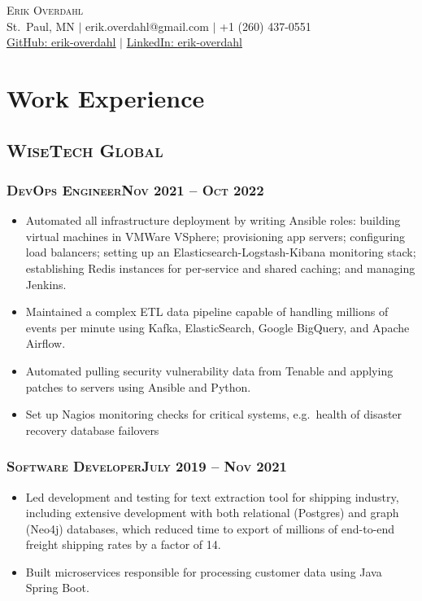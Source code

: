 \documentclass{article}
\newcommand{\resumeSection}[1]{\section*{#1}}
\newcommand{\institution}[1]{\subsection*{\scshape{#1}}}
\newcommand{\jobPosition}[3]{\subsubsection*{\scshape{#1}\hfill #2 -- #3}}
\begin{document}
\begin{center}
  {\Huge\scshape{Erik Overdahl}}
  \\\vspace{3pt}
  \normalsize{
    St.\ Paul, MN
    $|$
    erik.overdahl@gmail.com
    $|$
    +1 (260) 437-0551
    \\
    \href{https://github.com/erik-overdahl}{GitHub: \underline{erik-overdahl}}
    $|$
    \href{https://linkedin.com/in/erik-overdahl}{LinkedIn: \underline{erik-overdahl}}
  }
\end{center}

\resumeSection{Work Experience}

  \institution{WiseTech Global}

    \jobPosition{DevOps Engineer}{Nov 2021}{Oct 2022}
    \begin{itemize}[noitemsep]
      \item
            Automated all infrastructure deployment by writing Ansible
            roles: building virtual machines in VMWare VSphere; provisioning app
            servers; configuring load balancers; setting up an
            Elasticsearch-Logstash-Kibana monitoring stack; establishing Redis
            instances for per-service and shared caching; and managing Jenkins.
      \item
            Maintained a complex ETL data pipeline capable of handling
            millions of events per minute using Kafka, ElasticSearch, Google BigQuery,
            and Apache Airflow.
      \item
            Automated pulling security vulnerability data from Tenable and
            applying patches to servers using Ansible and Python.
      \item
            Set up Nagios monitoring checks for critical systems, e.g.\ health of disaster recovery database failovers
    \end{itemize}

    \jobPosition{Software Developer}{July 2019}{Nov 2021}
    \begin{itemize}[noitemsep]
      \item
            Led development and testing for text extraction tool for
            shipping industry, including extensive development with
            both relational (Postgres) and graph (Neo4j) databases, which reduced time to
            export of millions of end-to-end freight shipping rates by
            a factor of 14.
      \item
            Built microservices responsible for processing customer
            data using Java Spring Boot.
    \end{itemize}
\end{document}
